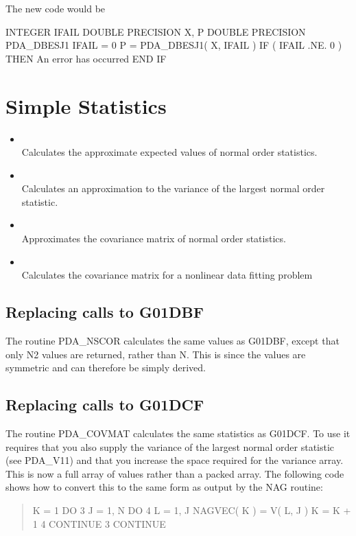 \documentclass[11pt,twoside,nolof]{starlink}
\begin{document}
   The new code would be

\begin{terminalv}
      INTEGER IFAIL
      DOUBLE PRECISION X, P
      DOUBLE PRECISION PDA_DBESJ1
      IFAIL = 0
      P = PDA_DBESJ1( X, IFAIL )
      IF ( IFAIL .NE. 0 ) THEN
         An error has occurred
      END IF
\end{terminalv}

\section{Simple Statistics}
\begin{itemize}
   \item {} \\
         Calculates the approximate expected values of normal order statistics.
   \item {} \\
         Calculates an approximation to the variance of the largest
         normal order statistic.
   \item {} \\
         Approximates the covariance matrix of normal order statistics.
   \item {} \\
    Calculates the covariance matrix for a nonlinear data fitting problem
\end{itemize}

\subsection{Replacing calls to G01DBF}
The routine PDA\_NSCOR calculates the same values as G01DBF, except
that only N2 values are returned, rather than N. This is since the
values are symmetric and can therefore be simply derived.

\subsection{Replacing calls to G01DCF}
The routine PDA\_COVMAT calculates the same statistics as G01DCF. To
use it requires that you also supply the variance of the largest
normal order statistic (see PDA\_V11) and that you increase the space
required for the variance array. This is now a full array of values
rather than a packed array. The following code shows how to convert
this to the same form as output by the NAG routine:
\begin{quote}
\begin{terminalv}
      K = 1
      DO 3 J = 1, N
         DO 4 L = 1, J
            NAGVEC( K ) = V( L, J )
            K = K + 1
 4       CONTINUE
 3    CONTINUE
\end{terminalv}
\end{quote}
\end{document}
